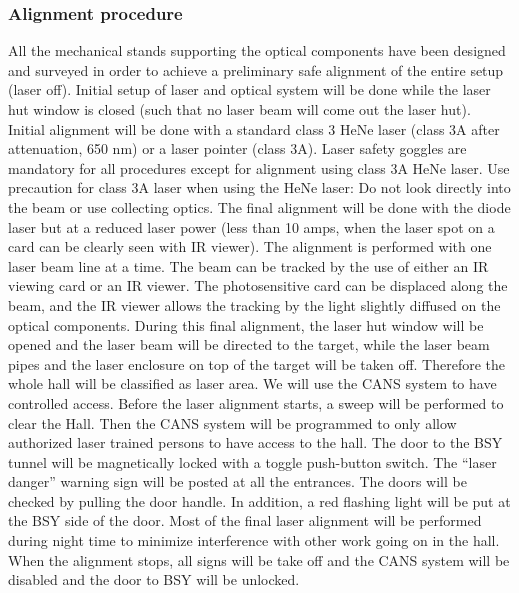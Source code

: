 {\subsubsection{Alignment procedure}

All the mechanical stands supporting the optical components have been
designed and surveyed in order to achieve a preliminary safe alignment
of the entire setup (laser off).  Initial setup of laser and optical
system will be done while the laser hut window is closed (such that no
laser beam will come out the laser hut).  Initial alignment will be
done with a standard class 3 HeNe laser (class 3A after attenuation,
650 nm) or a laser pointer (class 3A).  Laser safety goggles are
mandatory for all procedures except for alignment using class 3A HeNe
laser. Use precaution for class 3A laser when using the HeNe laser: Do
not look directly into the beam or use collecting optics.  The final
alignment will be done with the diode laser but at a reduced laser
power (less than 10 amps, when the laser spot on a card can be clearly
seen with IR viewer). The alignment is performed with one laser beam
line at a time.  The beam can be tracked by the use of either an IR
viewing card or an IR viewer.  The photosensitive card can be
displaced along the beam, and the IR viewer allows the tracking by the
light slightly diffused on the optical components. During this final
alignment, the laser hut window will be opened and the laser beam will
be directed to the target, while the laser beam pipes and the laser
enclosure on top of the target will be taken off. Therefore the whole
hall will be classified as laser area. We will use the CANS system to
have controlled access. Before the laser alignment starts, a sweep
will be performed to clear the Hall. Then the CANS system will be
programmed to only allow authorized laser trained persons to have
access to the hall.  The door to the BSY tunnel will be magnetically
locked with a toggle push-button switch. The ``laser danger'' warning
sign will be posted at all the entrances. The doors will be checked by
pulling the door handle. In addition, a red flashing light will be put
at the BSY side of the door.
Most of the final laser alignment will be performed during night time
to minimize interference with other work going on in the hall. When
the alignment stops, all signs will be take off and the CANS system
will be disabled and the door to BSY will be unlocked.

}
